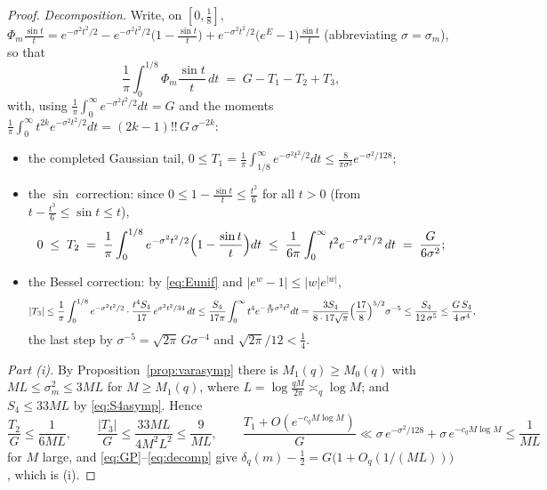 \begin{proof}
\emph{Decomposition.} Write, on $[0,\tfrac18]$,
$\Phi_m\frac{\sin t}t
=e^{-\sigma^2t^2/2}
-e^{-\sigma^2t^2/2}\bigl(1-\tfrac{\sin t}t\bigr)
+e^{-\sigma^2t^2/2}\bigl(e^{E}-1\bigr)\tfrac{\sin t}t$
(abbreviating $\sigma=\sigma_m$), so that
\begin{equation}\label{eq:decomp}
\frac1\pi\int_0^{1/8}\Phi_m\frac{\sin t}t\,dt
\;=\;G-T_1-T_2+T_3 ,
\end{equation}
with, using $\frac1\pi\int_0^\infty e^{-\sigma^2t^2/2}dt=G$ and the
moments $\frac1\pi\int_0^\infty t^{2k}e^{-\sigma^2t^2/2}dt
=(2k-1)!!\,G\,\sigma^{-2k}$:
\begin{itemize}
\item[$T_1$:] the completed Gaussian tail,
$0\le T_1=\frac1\pi\int_{1/8}^\infty e^{-\sigma^2t^2/2}dt
\le\frac{8}{\pi\sigma^2}e^{-\sigma^2/128}$;
\item[$T_2$:] the $\sin$ correction: since
$0\le1-\frac{\sin t}t\le\frac{t^2}6$ for all $t>0$ (from
$t-\frac{t^3}6\le\sin t\le t$),
\[
0\;\le\;T_2\;=\;\frac1\pi\int_0^{1/8}
e^{-\sigma^2t^2/2}\Bigl(1-\frac{\sin t}t\Bigr)dt
\;\le\;\frac1{6\pi}\int_0^{\infty}t^2e^{-\sigma^2t^2/2}\,dt
\;=\;\frac{G}{6\sigma^{2}} ;
\]
\item[$T_3$:] the Bessel correction: by \eqref{eq:Eunif} and
$|e^w-1|\le|w|e^{|w|}$,
\[
|T_3|\le\frac1\pi\int_0^{1/8}e^{-\sigma^2t^2/2}
\cdot\frac{t^4S_4}{17}\,e^{\sigma^2t^2/34}\,dt
\le\frac{S_4}{17\pi}\int_0^\infty t^4e^{-\frac{8}{17}\sigma^2t^2}dt
=\frac{3S_4}{8\cdot17\sqrt\pi}
\Bigl(\frac{17}{8}\Bigr)^{5/2}\sigma^{-5}
\le\frac{S_4}{12\,\sigma^{5}}\le\frac{G\,S_4}{4\,\sigma^{4}} ,
\]
the last step by $\sigma^{-5}=\sqrt{2\pi}\,G\sigma^{-4}$ and
$\sqrt{2\pi}/12<\tfrac14$.
\end{itemize}

\emph{Part (i).} By Proposition~\ref{prop:varasymp} there is
$M_1(q)\ge M_0(q)$ with
$ML\le\sigma_m^2\le3ML$ for $M\ge M_1(q)$, where
$L=\log\tfrac{qM}{2\pi}\asymp_q\log M$; and
$S_4\le33ML$ by \eqref{eq:S4asymp}. Hence
\[
\frac{T_2}{G}\le\frac1{6ML},\qquad
\frac{|T_3|}{G}\le\frac{33ML}{4M^2L^2}\le\frac{9}{ML},\qquad
\frac{T_1+O(e^{-c_qM\log M})}{G}
\ll\sigma\,e^{-\sigma^2/128}+\sigma\,e^{-c_qM\log M}
\le\frac1{ML}
\]
for $M$ large, and \eqref{eq:GP}--\eqref{eq:decomp} give
$\delta_q(m)-\tfrac12=G\bigl(1+O_q(1/(ML))\bigr)$, which is (i).


\end{proof}
